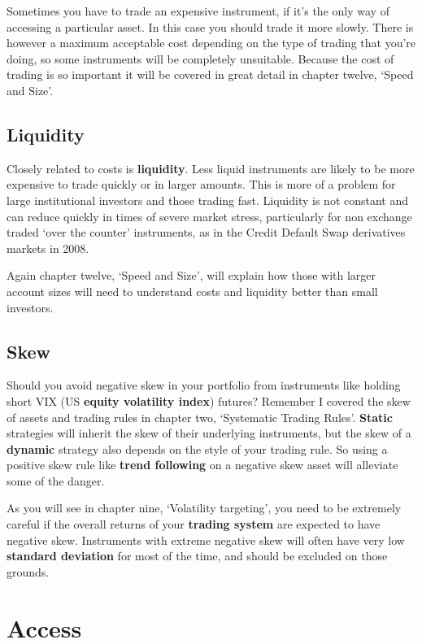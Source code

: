 Sometimes you have to trade an expensive instrument, if it's the only way of accessing a particular asset. In this case you should trade it more slowly. There is however a maximum acceptable cost depending on the type of trading that you're doing, so some instruments will be completely unsuitable. Because the cost of trading is so important it will be covered in great detail in chapter twelve, ‘Speed and Size'.

\subsection*{Liquidity}

Closely related to costs is \textbf{liquidity}. Less liquid instruments are likely to be more expensive to trade quickly or in larger amounts. This is more of a problem for large institutional investors and those trading fast. Liquidity is not constant and can reduce quickly in times of severe market stress, particularly for non exchange traded ‘over the counter' instruments, as in the Credit Default Swap derivatives markets in 2008.

Again chapter twelve, ‘Speed and Size', will explain how those with larger account sizes will need to understand costs and liquidity better than small investors.

\subsection*{Skew}

Should you avoid negative skew in your portfolio from instruments like holding short VIX (US \textbf{equity volatility index}) futures? Remember I covered the skew of assets and trading rules in chapter two, ‘Systematic Trading Rules'. \textbf{Static} strategies will inherit the skew of their underlying instruments, but the skew of a \textbf{dynamic} strategy also depends on the style of your trading rule. So using a positive skew rule like \textbf{trend following} on a negative skew asset will alleviate some of the danger.

As you will see in chapter nine, ‘Volatility targeting', you need to be extremely careful if the overall returns of your \textbf{trading system} are expected to have negative skew. Instruments with extreme negative skew will often have very low \textbf{standard deviation} for most of the time, and should be excluded on those grounds.

\section*{Access}  {}

